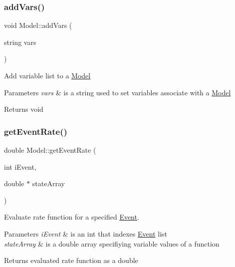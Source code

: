 \subsubsection{\texorpdfstring{add\+Vars()}{addVars()}}
{\footnotesize\ttfamily void Model\+::add\+Vars (\begin{DoxyParamCaption}\item[{string}]{vars }\end{DoxyParamCaption})}

Add variable list to a \hyperlink{class_model}{Model}


\begin{DoxyParams}{Parameters}
{\em vars} & is a string used to set variables associate with a \hyperlink{class_model}{Model} \\
\hline
\end{DoxyParams}
\begin{DoxyReturn}{Returns}
void 
\end{DoxyReturn}
\mbox{\label{class_model_a2909caddddccca90faaae708e68226ad}} 
\subsubsection{\texorpdfstring{get\+Event\+Rate()}{getEventRate()}}
{\footnotesize\ttfamily double Model\+::get\+Event\+Rate (\begin{DoxyParamCaption}\item[{int}]{i\+Event,  }\item[{double $\ast$}]{state\+Array }\end{DoxyParamCaption})}



Evaluate rate function for a specified \hyperlink{class_event}{Event}. 


\begin{DoxyParams}{Parameters}
{\em i\+Event} & is an int that indexes \hyperlink{class_event}{Event} list \\
\hline
{\em state\+Array} & is a double array specifiying variable values of a function \\
\hline
\end{DoxyParams}
\begin{DoxyReturn}{Returns}
evaluated rate function as a double 
\end{DoxyReturn}
\mbox{\label{class_model_adc48dad5a02caa940aaffee7e8377682}} 
